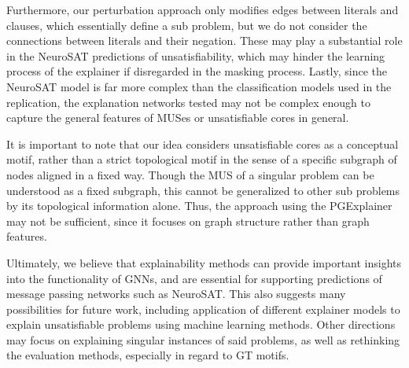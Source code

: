 Furthermore, our perturbation approach only modifies edges between literals and clauses, which essentially define a sub problem, but we do not consider the connections between literals and their negation. These may play a substantial role in the NeuroSAT predictions of unsatisfiability, which may hinder the learning process of the explainer if disregarded in the masking process. Lastly, since the NeuroSAT model is far more complex than the classification models used in the replication, the explanation networks tested may not be complex enough to capture the general features of MUSes or unsatisfiable cores in general. \bigskip

It is important to note that our idea considers unsatisfiable cores as a conceptual motif, rather than a strict topological motif in the sense of a specific subgraph of nodes aligned in a fixed way. Though the MUS of a singular problem can be understood as a fixed subgraph, this cannot be generalized to other sub problems by its topological information alone. Thus, the approach using the PGExplainer may not be sufficient, since it focuses on graph structure rather than graph features.

Ultimately, we believe that explainability methods can provide important insights into the functionality of GNNs, and are essential for supporting predictions of message passing networks such as NeuroSAT. This also suggests many possibilities for future work, including application of different explainer models to explain unsatisfiable problems using machine learning methods. Other directions may focus on explaining singular instances of said problems, as well as rethinking the evaluation methods, especially in regard to \ac{GT} motifs.